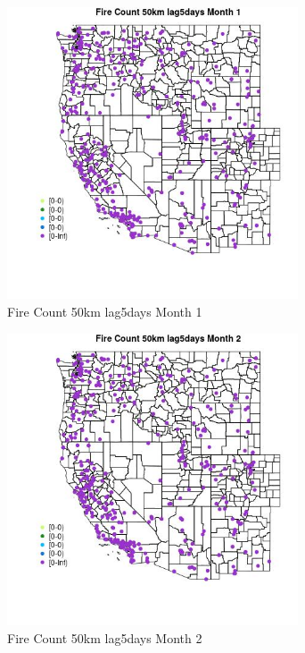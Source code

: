 \begin{figure} 
\centering  
\includegraphics[width=0.77\textwidth]{Code_Outputs/Report_ML_input_PM25_Step4_part_e_de_duplicated_aves_compiled_2019-05-18wNAs_MapObsMo1Fire_Count_50km_lag5days.jpg} 
\caption{\label{fig:Report_ML_input_PM25_Step4_part_e_de_duplicated_aves_compiled_2019-05-18wNAsMapObsMo1Fire_Count_50km_lag5days}Fire Count 50km lag5days Month 1} 
\end{figure} 
 

\begin{figure} 
\centering  
\includegraphics[width=0.77\textwidth]{Code_Outputs/Report_ML_input_PM25_Step4_part_e_de_duplicated_aves_compiled_2019-05-18wNAs_MapObsMo2Fire_Count_50km_lag5days.jpg} 
\caption{\label{fig:Report_ML_input_PM25_Step4_part_e_de_duplicated_aves_compiled_2019-05-18wNAsMapObsMo2Fire_Count_50km_lag5days}Fire Count 50km lag5days Month 2} 
\end{figure} 
 

